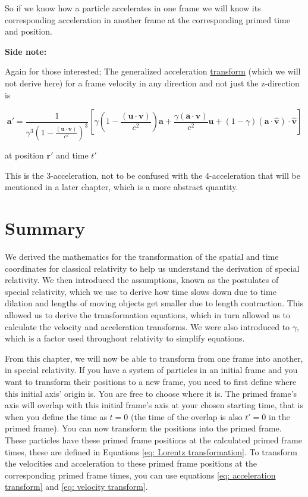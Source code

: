 So if we know how a particle accelerates in one frame we will know its corresponding acceleration in another frame at the corresponding primed time and position.

\textbf{Side note:}

Again for those interested; The generalized acceleration \hyperlink{def-transform}{transform} (which we will not derive here) for a frame velocity in any direction and not just the z-direction is

\begin{equation}
	\mathbf{a{'}} = \frac{1}{{\gamma} ^3 \left(1-\frac{(\mathbf{u}\cdot \mathbf{v})}{{c}^2}\right)^3}\left[ {\gamma} \left(1-\frac{(\mathbf{u}\cdot\mathbf{v})}{{c}^2}\right)\mathbf{a} + \frac{{\gamma} (\mathbf{a}\cdot\mathbf{v})}{{c}^2}\mathbf{u} + (1-{\gamma} ) (\mathbf{a}\cdot\hat{\mathbf{v}}) \cdot\hat{\mathbf{v}}\right]
\end{equation}

at position ${\mathbf{r}{'}}$ and time ${t{'}}$

This is the 3-acceleration, not to be confused with the 4-acceleration that will be mentioned in a later chapter, which is a more abstract quantity.

\section{Summary}

We derived the mathematics for the transformation of the spatial and time coordinates for classical relativity to help us understand the derivation of special relativity.
We then introduced the assumptions, known as the postulates of special relativity, which we use to derive how time slows down due to time dilation and lengths of moving objects get smaller due to length contraction.
This allowed us to derive the transformation equations, which in turn allowed us to calculate the velocity and acceleration transforms.
We were also introduced to $\gamma$, which is a factor used throughout relativity to simplify equations.

From this chapter, we will now be able to transform from one frame into another, in special relativity.
If you have a system of particles in an initial frame and you want to transform their positions to a new frame, you need to first define where this initial axis' origin is.
You are free to choose where it is.
The primed frame's axis will overlap with this initial frame's axis at your chosen starting time, that is when you define the time as ${t}=0$ (the time of the overlap is also ${t{'}}=0$ in the primed frame).
You can now transform the positions into the primed frame.
These particles have these primed frame positions at the calculated primed frame times, these are defined in Equations \eqref{eq: Lorentz transformation}.
To transform the velocities and acceleration to these primed frame positions at the corresponding primed frame times, you can use equations \eqref{eq: acceleration transform} and \eqref{eq: velocity transform}.

